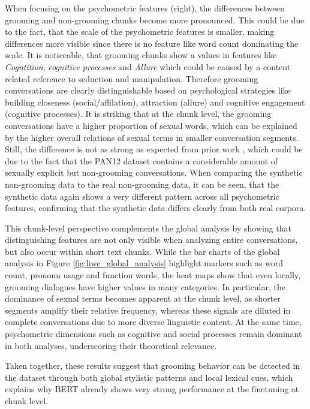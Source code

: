 When focusing on the psychometric features (right), the differences between grooming and non-grooming chunks become more pronounced. This could be due to the fact, that the scale of the psychometric features is smaller, making differences more visible since there is no feature like word count dominating the scale. It is noticeable, that grooming chunks show a values in features like \textit{Cogntition}, \textit{cognitive processes} and \textit{Allure} which could be caused by a content related reference to seduction and manipulation. Therefore grooming conversations are clearly distinguishable based on psychological strategies like building closeness (social/affilation), attraction (allure) and cognitive engagement (cognitive processes). It is striking that at the chunk level, the grooming conversations have a higher proportion of sexual words, which can be explained by the higher overall relations of sexual terms in smaller conversation segments. Still, the difference is not as strong as expected from prior work \cite{broome2020psycholinguistic,an2025cybergrooming}, which could be due to the fact that the PAN12 dataset contains a considerable amount of sexually explicit but non-grooming conversations. When comparing the synthetic non-grooming data to the real non-grooming data, it can be seen, that the synthetic data again shows a very different pattern across all psychometric features, confirming that the synthetic data differs clearly from both real corpora. 

This chunk-level perspective complements the global analysis by showing that distinguishing features are not only visible when analyzing entire conversations, but also occur within short text chunks. While the bar charts of the global analysis in Figure \ref{fig:liwc_global_analysis} highlight markers such as word count, pronoun usage and function words, the heat maps show that even locally, grooming dialogues have higher values in many categories. In particular, the dominance of sexual terms becomes apparent at the chunk level, as shorter segments amplify their relative frequency, whereas these signals are diluted in complete conversations due to more diverse linguistic content. At the same time, psychometric dimensions such as cognitive and social processes remain dominant in both analyses, underscoring their theoretical relevance.

Taken together, these results suggest that grooming behavior can be detected in the dataset through both global stylistic patterns and local lexical cues, which explains why BERT already shows very strong performance at the finetuning at chunk level.


